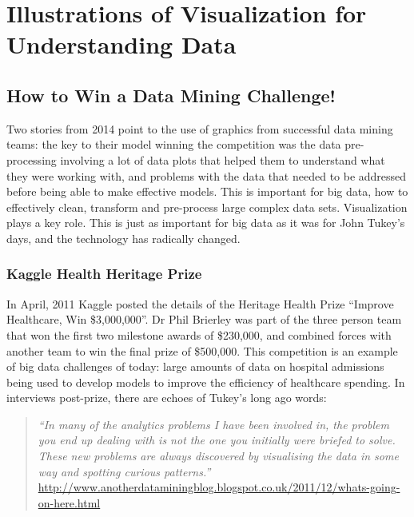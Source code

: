 \documentclass{article}
\begin{document}
\section{Illustrations of Visualization for Understanding Data}

\subsection{How to Win a Data Mining Challenge!}

Two stories from 2014 point to the use of graphics from successful data mining teams: the key to their model winning the competition was the data pre-processing involving a lot of data plots that helped them to understand what they were working with, and problems with the data that needed to be addressed before being able to make effective models. This is important for big data, how to effectively clean, transform and pre-process large complex data sets. Visualization plays a key role. This is just as important for big data as it was for John Tukey's days, and the technology has radically changed.

\subsubsection{Kaggle Health Heritage Prize}

In April, 2011 Kaggle posted the details of the Heritage Health Prize ``Improve Healthcare, Win \$3,000,000''.  Dr Phil Brierley was part of the three person team that won the first two milestone awards of \$230,000, and combined forces with another team to win the final prize of \$500,000. This competition is an example of big data challenges of today: large amounts of data on hospital admissions being used to develop models to improve the efficiency of healthcare spending. In interviews post-prize, there are echoes of Tukey's long ago words:

\begin{quote}
{\em ``In many of the analytics problems I have been involved in, the problem you end up dealing with is not the one you initially were briefed to solve.
These new problems are always discovered by visualising the data in some way and spotting curious patterns.'' }\url{http://www.anotherdataminingblog.blogspot.co.uk/2011/12/whats-going-on-here.html}
\end{quote}
\end{document}
